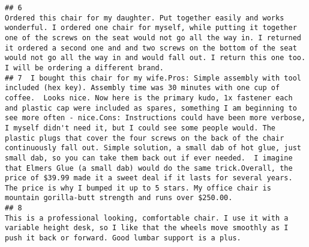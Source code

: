 \documentclass[
]{article}
\begin{document}
\begin{verbatim}
## 6                                                                                                                                                                                                                                                                                                                                                                                                                                                                                             Ordered this chair for my daughter. Put together easily and works wonderful. I ordered one chair for myself, while putting it together one of the screws on the seat would not go all the way in. I returned it ordered a second one and and two screws on the bottom of the seat would not go all the way in and would fall out. I return this one too. I will be ordering a different brand.
## 7  I bought this chair for my wife.Pros: Simple assembly with tool included (hex key). Assembly time was 30 minutes with one cup of coffee.  Looks nice. Now here is the primary kudo, 1x fastener each and plastic cap were included as spares, something I am beginning to see more often - nice.Cons: Instructions could have been more verbose, I myself didn't need it, but I could see some people would. The plastic plugs that cover the four screws on the back of the chair continuously fall out. Simple solution, a small dab of hot glue, just small dab, so you can take them back out if ever needed.  I imagine that Elmers Glue (a small dab) would do the same trick.Overall, the price of $39.99 made it a sweet deal if it lasts for several years. The price is why I bumped it up to 5 stars. My office chair is mountain gorilla-butt strength and runs over $250.00.
## 8                                                                                                                                                                                                                                                                                                                                                                                                                                                                                                                                                                                                                                                                                              This is a professional looking, comfortable chair. I use it with a variable height desk, so I like that the wheels move smoothly as I push it back or forward. Good lumbar support is a plus.

\end{verbatim}
\end{document}
